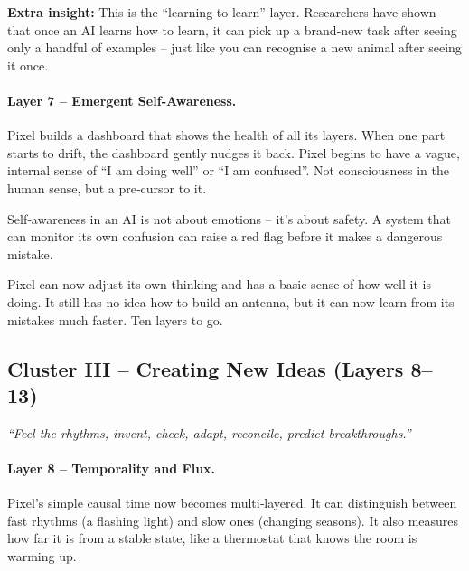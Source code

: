 \textbf{Extra insight:} This is the “learning to learn” layer.
Researchers have shown that once an AI learns how to learn, it can
pick up a brand‑new task after seeing only a handful of examples – just
like you can recognise a new animal after seeing it once.

\paragraph{Layer 7 – Emergent Self‑Awareness.}
Pixel builds a dashboard that shows the health of all its layers.
When one part starts to drift, the dashboard gently nudges it back.
Pixel begins to have a vague, internal sense of “I am doing well” or
“I am confused”.  Not consciousness in the human sense, but a
pre‑cursor to it.

\begin{tcolorbox}[colback=green!5, colframe=green!60, title=Why this matters]
Self‑awareness in an AI is not about emotions – it’s about safety.
A system that can monitor its own confusion can raise a red flag
before it makes a dangerous mistake.
\end{tcolorbox}

\begin{tcolorbox}[colback=black!3, colframe=black!40, title=\textbf{Mission Log – End of Cluster II}]
Pixel can now adjust its own thinking and has a basic sense of how
well it is doing.  It still has no idea how to build an antenna, but
it can now learn from its mistakes much faster.  Ten layers to go.
\end{tcolorbox}

\subsection*{Cluster III – Creating New Ideas (Layers 8–13)}

\begin{tcolorbox}[colback=blue!5, colframe=blue!60, title=\textbf{Superpowers: The Multi‑Timer, The Creator, The Editor, The Contextualiser, The Bridge‑Builder, The Seismologist}]
\begin{center}
\textit{“Feel the rhythms, invent, check, adapt, reconcile, predict breakthroughs.”}
\end{center}
\end{tcolorbox}

\paragraph{Layer 8 – Temporality and Flux.}
Pixel’s simple causal time now becomes multi‑layered.  It can
distinguish between fast rhythms (a flashing light) and slow ones
(changing seasons).  It also measures how far it is from a stable
state, like a thermostat that knows the room is warming up.


